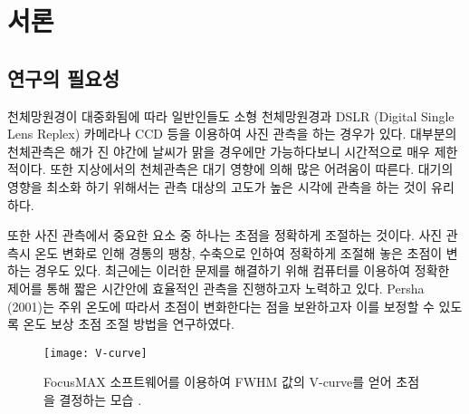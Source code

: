 

\section{서론}
\subsection{연구의 필요성}

천체망원경이 대중화됨에 따라 일반인들도 소형 천체망원경과 DSLR (Digital Single Lens Replex) 카메라나 CCD 등을 이용하여 사진 관측을 하는 경우가 있다. 대부분의 천체관측은 해가 진 야간에 날씨가 맑을 경우에만 가능하다보니 시간적으로 매우 제한적이다. 또한 지상에서의 천체관측은 대기 영향에 의해 많은 어려움이 따른다. 대기의 영향을 최소화 하기 위해서는 관측 대상의 고도가 높은 시각에 관측을 하는 것이 유리하다. 

또한 사진 관측에서 중요한 요소 중 하나는 초점을 정확하게 조절하는 것이다. 사진 관측시 온도 변화로 인해 경통의 팽창, 수축으로 인하여 정확하게 조절해 놓은 초점이 변하는 경우도 있다. 최근에는 이러한 문제를 해결하기 위해 컴퓨터를 이용하여 정확한 제어를 통해 짧은 시간안에 효율적인 관측을 진행하고자 노력하고 있다. Persha (2001)는 주위 온도에 따라서 초점이 변화한다는 점을 보완하고자 이를 보정할 수 있도록 온도 보상 초점 조절 방법을 연구하였다.\cite{persha2001temperature} 



\begin{figure}[h]
	\begin{center}
		\texttt{[image: V-curve]}
	\end{center}
	\caption{FocusMAX 소프트웨어를 이용하여 FWHM 값의 V-curve를 얻어 초점을 결정하는 모습 \cite{weber2001fast}.}
	\label{V-curve}
\end{figure}

